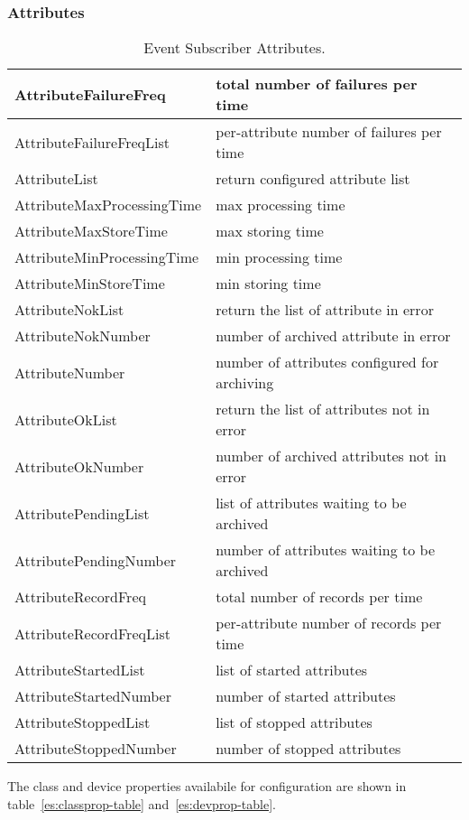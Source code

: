 \documentclass[11pt,a4paper]{article}
\def \es{Event Subscriber}
\begin{document}
\subsubsection{Attributes}
\label{es:attributes}
\begin{table}[H]
	\begin{tabular}{p{}|p{}}
		\hline
		AttributeFailureFreq & total number of failures per time \\
		\hline
		AttributeFailureFreqList & per-attribute number of failures per time \\
		\hline
		AttributeList & return configured attribute list \\
		\hline
		AttributeMaxProcessingTime & max processing time \\
		\hline
		AttributeMaxStoreTime & max storing time \\
		\hline
		AttributeMinProcessingTime & min processing time \\
		\hline
		AttributeMinStoreTime & min storing time \\
		\hline
		AttributeNokList & return the list of attribute in error \\
		\hline
		AttributeNokNumber & number of archived attribute in error \\
		\hline
		AttributeNumber & number of attributes configured for archiving \\
		\hline
		AttributeOkList & return the list of attributes not in error \\
		\hline
		AttributeOkNumber & number of archived attributes not in error \\
		\hline
		AttributePendingList & list of attributes waiting to be archived \\
		\hline
		AttributePendingNumber & number of attributes waiting to be archived \\
		\hline
		AttributeRecordFreq & total number of records per time \\
		\hline
		AttributeRecordFreqList & per-attribute number of records per time \\
		\hline
		AttributeStartedList & list of started attributes \\
		\hline
		AttributeStartedNumber & number of started attributes \\
		\hline
		AttributeStoppedList & list of stopped attributes \\
		\hline
		AttributeStoppedNumber & number of stopped attributes \\
		\hline
	\end{tabular}
	\caption{\es{} Attributes.}
	\label{es:attributes-table}
\end{table}
The class and device properties availabile for configuration are
shown in table~\ref{es:classprop-table} and~\ref{es:devprop-table}.
\end{document}
